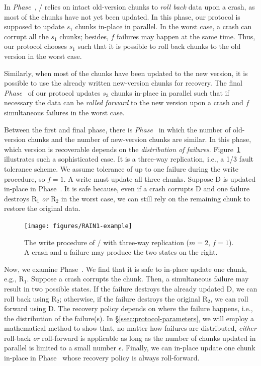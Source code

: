 In \emph{Phase~}, \protocol/ relies on intact old-version chunks to \emph{roll back}
data upon a crash, as most of the chunks have not yet been updated.  In this
phase, our protocol is supposed to update $s_1$ chunks in-place in parallel. In
the worst case, a crash can corrupt all the $s_1$ chunks; besides,
$f$ failures may happen at the same time. Thus, our protocol chooses $s_1$
such that it is possible to roll back chunks to the old version in the worst
case.

Similarly, when most of the chunks have been updated to the new version, it is
possible  to use the already written new-version chunks for recovery. The final
\emph{Phase~} of our protocol updates $s_3$ chunks in-place in parallel
such that if necessary the data can be \emph{rolled forward} to the new version upon a crash
and $f$ simultaneous failures in the worst case.

Between the first and final phase, there is \emph{Phase~} in which the number
of old-version chunks and the number of new-version chunks are similar. In this
phase, which version is recoverable depends on the \emph{distribution of failures}.
Figure~\ref{fig:rain1-example} illustrates such a sophisticated case.
It is a three-way replication, i.e., a 1/3 fault
tolerance scheme. We assume tolerance of up to
one failure during the write procedure, so $f = 1$. A write must update all three
chunks. Suppose D is
updated in-place in Phase~. It is safe because, even if a crash corrupts D and one failure destroys R$_1$ \emph{or} R$_2$ in the worst case, we can still rely on the remaining chunk to restore the original data.

\begin{figure}[!h]
  \centering
  \vspace{-0.5em}
  \texttt{[image: figures/RAIN1-example]}
  \caption{The write procedure of \protocol/ with three-way replication
($m = 2$, $f = 1$). A crash and a failure may produce the two states on the
right.}
  \vspace{-0.5em}
  \label{fig:rain1-example}
\end{figure}

Now, we examine Phase~. We find that it is safe to in-place update one chunk, e.g., R$_1$.
Suppose a crash corrupts the chunk. Then, a simultaneous failure may result in two
possible states. If the failure
destroys the already updated D, we can roll back using R$_2$; otherwise, if the
failure destroys the original R$_2$, we can roll forward using D. The recovery
policy depends on where the failure happens, i.e., the distribution of the failure(s).
In \S\ref{ssec:protocol-parameters}, we will employ a mathematical method to
show that, no matter how failures are distributed,
\emph{either} roll-back \emph{or} roll-forward is applicable as long as the
number of chunks updated in parallel is limited to a small number $\epsilon$.
Finally, we can in-place update one chunk in-place in Phase~ whose recovery policy is always roll-forward.

